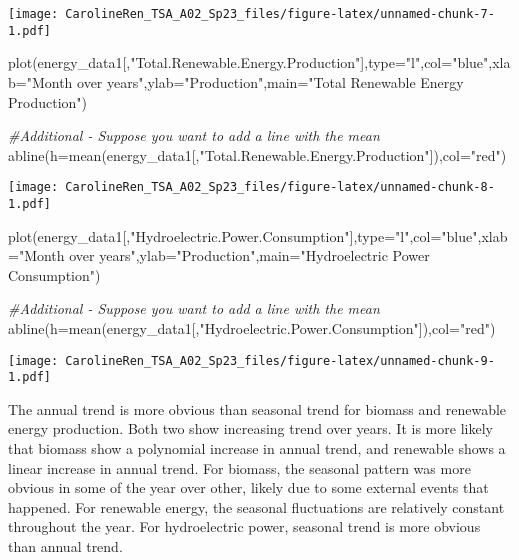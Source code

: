 \documentclass[
]{article}
\newenvironment{Shaded}{\begin{snugshade}}{\end{snugshade}}
\newcommand{\AttributeTok}[1]{\textcolor[rgb]{0.77,0.63,0.00}{#1}}
\newcommand{\CommentTok}[1]{\textcolor[rgb]{0.56,0.35,0.01}{\textit{#1}}}
\newcommand{\FunctionTok}[1]{\textcolor[rgb]{0.00,0.00,0.00}{#1}}
\newcommand{\NormalTok}[1]{#1}
\newcommand{\StringTok}[1]{\textcolor[rgb]{0.31,0.60,0.02}{#1}}
\begin{document}
\texttt{[image: CarolineRen\_TSA\_A02\_Sp23\_files/figure-latex/unnamed-chunk-7-1.pdf]}

\begin{Shaded}
\begin{Highlighting}[]
\FunctionTok{plot}\NormalTok{(energy\_data1[,}\StringTok{"Total.Renewable.Energy.Production"}\NormalTok{],}\AttributeTok{type=}\StringTok{"l"}\NormalTok{,}\AttributeTok{col=}\StringTok{"blue"}\NormalTok{,}\AttributeTok{xlab=}\StringTok{"Month over years"}\NormalTok{,}\AttributeTok{ylab=}\StringTok{"Production"}\NormalTok{,}\AttributeTok{main=}\StringTok{"Total Renewable Energy Production"}\NormalTok{) }

\CommentTok{\#Additional {-} Suppose you want to add a line with the mean}
\FunctionTok{abline}\NormalTok{(}\AttributeTok{h=}\FunctionTok{mean}\NormalTok{(energy\_data1[,}\StringTok{"Total.Renewable.Energy.Production"}\NormalTok{]),}\AttributeTok{col=}\StringTok{"red"}\NormalTok{)}
\end{Highlighting}
\end{Shaded}

\texttt{[image: CarolineRen\_TSA\_A02\_Sp23\_files/figure-latex/unnamed-chunk-8-1.pdf]}

\begin{Shaded}
\begin{Highlighting}[]
\FunctionTok{plot}\NormalTok{(energy\_data1[,}\StringTok{"Hydroelectric.Power.Consumption"}\NormalTok{],}\AttributeTok{type=}\StringTok{"l"}\NormalTok{,}\AttributeTok{col=}\StringTok{"blue"}\NormalTok{,}\AttributeTok{xlab=}\StringTok{"Month over years"}\NormalTok{,}\AttributeTok{ylab=}\StringTok{"Production"}\NormalTok{,}\AttributeTok{main=}\StringTok{"Hydroelectric Power Consumption"}\NormalTok{) }

\CommentTok{\#Additional {-} Suppose you want to add a line with the mean}
\FunctionTok{abline}\NormalTok{(}\AttributeTok{h=}\FunctionTok{mean}\NormalTok{(energy\_data1[,}\StringTok{"Hydroelectric.Power.Consumption"}\NormalTok{]),}\AttributeTok{col=}\StringTok{"red"}\NormalTok{)}
\end{Highlighting}
\end{Shaded}

\texttt{[image: CarolineRen\_TSA\_A02\_Sp23\_files/figure-latex/unnamed-chunk-9-1.pdf]}

The annual trend is more obvious than seasonal trend for biomass and
renewable energy production. Both two show increasing trend over years.
It is more likely that biomass show a polynomial increase in annual
trend, and renewable shows a linear increase in annual trend. For
biomass, the seasonal pattern was more obvious in some of the year over
other, likely due to some external events that happened. For renewable
energy, the seasonal fluctuations are relatively constant throughout the
year. For hydroelectric power, seasonal trend is more obvious than
annual trend.
\end{document}
